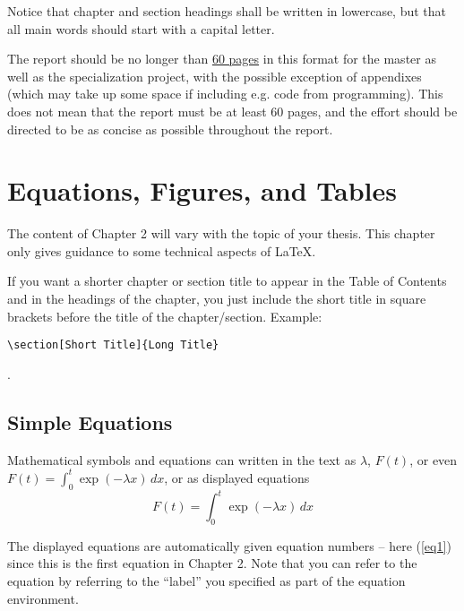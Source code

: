 \documentclass[12pt]{report}
\begin{document}
\begin{remark}
Notice that chapter and section headings shall be written in lowercase, but that all main words should start with a capital letter.
\end{remark}



The report should be no longer than \underline{60 pages} in this format for the master as well as the specialization project, with the possible exception of appendixes (which may take up some space if including e.g. code from programming). This does not mean that the report must be at least 60 pages, and the effort should be directed to be as concise as possible throughout the report.
\chapter[Equations, etc]{Equations, Figures, and Tables}
The content of Chapter 2 will vary with the topic of your thesis. This chapter only gives guidance to some technical aspects of \LaTeX.
 
\begin{remark}
If you want a shorter chapter or section title to appear in the Table of Contents and in the headings of the chapter, you just include the short title in square brackets before the title of the chapter/section. Example: \begin{verbatim}\section[Short Title]{Long Title}\end{verbatim}.
\end{remark}

\section{Simple Equations}
Mathematical symbols and equations can written in the text as $\lambda$, $F(t)$, or even $F(t)=\int_0^t \exp(-\lambda x)\,dx$, or as displayed equations
\begin{equation}
F(t)=\int_0^t \exp(-\lambda x)\,dx
\label{eq1}
\end{equation}


The displayed equations are automatically given equation numbers -- here (\ref{eq1}) since this is the first equation in Chapter 2. Note that you can refer to the equation by referring to the ``label'' you specified as part of the equation environment.
\end{document}
